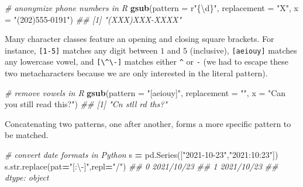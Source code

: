 \documentclass[12pt,krantz2]{krantz}
\makeatletter
\newenvironment{Shaded}{\begin{snugshade}}{\end{snugshade}}
\newcommand{\BuiltInTok}[1]{#1}
\newcommand{\CommentTok}[1]{\textcolor[rgb]{0.37,0.37,0.37}{\textit{#1}}}
\newcommand{\DataTypeTok}[1]{\textcolor[rgb]{0.27,0.27,0.27}{#1}}
\newcommand{\KeywordTok}[1]{\textcolor[rgb]{0.27,0.27,0.27}{\textbf{#1}}}
\newcommand{\NormalTok}[1]{#1}
\newcommand{\OperatorTok}[1]{\textcolor[rgb]{0.43,0.43,0.43}{\textbf{#1}}}
\newcommand{\StringTok}[1]{\textcolor[rgb]{0.5,0.5,0.5}{#1}}
\newenvironment{kframe}{%
\medskip{}
\setlength{\fboxsep}{.8em}
 \def\at@end@of@kframe{}%
 \ifinner\ifhmode%
  \def\at@end@of@kframe{\end{minipage}}%
  \begin{minipage}{\columnwidth}%
 \fi\fi%
 \def\FrameCommand##1{\hskip\@totalleftmargin \hskip-\fboxsep
 \colorbox{shadecolor}{##1}\hskip-\fboxsep
     \hskip-\linewidth \hskip-\@totalleftmargin \hskip\columnwidth}%
 \MakeFramed {\advance\hsize-\width
   \@totalleftmargin\z@ \linewidth\hsize
   \@setminipage}}%
 {\par\unskip\endMakeFramed%
 \at@end@of@kframe}
\renewenvironment{Shaded}{\begin{kframe}}{\end{kframe}}
\makeatother
\begin{document}
\begin{Shaded}
\begin{Highlighting}[]
\CommentTok{# anonymize phone numbers in R}
\KeywordTok{gsub}\NormalTok{(}\DataTypeTok{pattern =}\NormalTok{ r}\StringTok{"\{\textbackslash{}d\}"}\NormalTok{, }\DataTypeTok{replacement =} \StringTok{"X"}\NormalTok{, }\DataTypeTok{x =} \StringTok{"(202)555-0191"}\NormalTok{)}
\CommentTok{## [1] "(XXX)XXX-XXXX"}
\end{Highlighting}
\end{Shaded}

\begin{Shaded}
\end{Shaded}

Many character classes feature an opening and closing square brackets. For instance, \texttt{{[}1-5{]}} matches any digit between \(1\) and \(5\) (inclusive), \texttt{{[}aeiouy{]}} matches any lowercase vowel, and \texttt{{[}\textbackslash{}\^{}\textbackslash{}-{]}} matches either \texttt{\^{}} or \texttt{-} (we had to escape these two metacharacters because we are only interested in the literal pattern).

\begin{Shaded}
\begin{Highlighting}[]
\CommentTok{# remove vowels in R}
\KeywordTok{gsub}\NormalTok{(}\DataTypeTok{pattern =} \StringTok{"[aeiouy]"}\NormalTok{, }\DataTypeTok{replacement =} \StringTok{""}\NormalTok{, }
     \DataTypeTok{x =} \StringTok{"Can you still read this?"}\NormalTok{)}
\CommentTok{## [1] "Cn  stll rd ths?"}
\end{Highlighting}
\end{Shaded}

Concatenating two patterns, one after another, forms a more specific pattern to be matched.

\begin{Shaded}
\begin{Highlighting}[]
\CommentTok{# convert date formats in Python}
\NormalTok{s }\OperatorTok{=}\NormalTok{ pd.Series([}\StringTok{"2021-10-23"}\NormalTok{,}\StringTok{"2021:10:23"}\NormalTok{])}
\NormalTok{s.}\BuiltInTok{str}\NormalTok{.replace(pat}\OperatorTok{=}\StringTok{"[:\textbackslash{}-]"}\NormalTok{,repl}\OperatorTok{=}\StringTok{"/"}\NormalTok{)}
\CommentTok{## 0    2021/10/23}
\CommentTok{## 1    2021/10/23}
\CommentTok{## dtype: object}
\end{Highlighting}
\end{Shaded}
\end{document}
